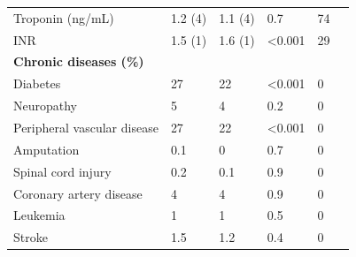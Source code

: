 \documentclass{ws-procs11x85}
\begin{document}
\begin{table}[H]
\begin{adjustbox}{width=1\textwidth}
\begin{tabular}{llllll}
\hspace{1cm} Troponin (ng/mL)                 & 1.2 (4)                        & 1.1 (4)                            & 0.7               & 74                      &  \\
\hspace{1cm} INR                  & 1.5 (1)                        & 1.6 (1)                            & \textless 0.001               & 29                      &  \\
\textbf{Chronic diseases (\%)}                      &                                         &                                     &                  &                         &  \\
\hspace{1cm} Diabetes                                     & 27                                      & 22                                  & \textless 0.001  & 0                       &  \\
\hspace{1cm} Neuropathy                                   & 5                                       & 4                                   & 0.2         & 0                       &  \\
\hspace{1cm} Peripheral vascular disease                  & 27                                      & 22                                  & \textless 0.001  & 0                       &  \\
\hspace{1cm} Amputation                                   & 0.1                                     & 0                                   & 0.7              & 0                       &  \\
\hspace{1cm} Spinal cord injury                           & 0.2                                     & 0.1                                 & 0.9              & 0                       &  \\
\hspace{1cm} Coronary artery disease                      & 4                                       & 4                                   & 0.9              & 0                       &  \\
\hspace{1cm} Leukemia                                     & 1                                       & 1                                   & 0.5              & 0                       &  \\
\hspace{1cm} Stroke                                       & 1.5                                     & 1.2                                 & 0.4              & 0                       &  \\

\end{tabular}
\end{adjustbox}
\end{table}
\end{document}
